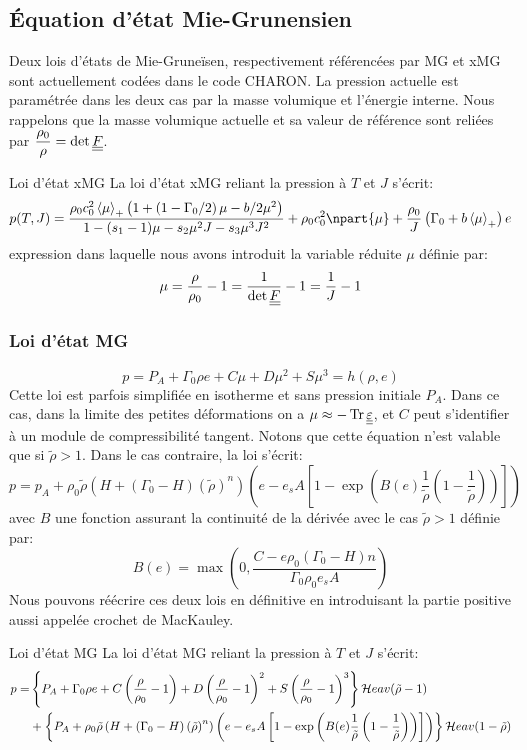 \documentclass[10pt]{book}
\begin{document}
\subsection{Équation d'état Mie-Grunensien}
Deux lois d'états de Mie-Gruneïsen, respectivement référencées par \og
MG \fg{} et \og xMG \fg{} sont actuellement codées dans le code CHARON. La pression actuelle est paramétrée dans les deux cas par la masse volumique et l'énergie interne. Nous rappelons que la masse volumique actuelle et sa valeur de référence sont reliées par $\dfrac{\rho_{0}}{\rho}=\det\underline{\underline{F}}$.
\begin{Propo}{Loi d'état xMG} La loi d'état xMG reliant la pression à $T$ et $J$ s'écrit:
$$p(T,J)=\dfrac{\rho_{0}c_{0}^{2}\ppart{\mu}\left(1+\left(1-\Gamma_{0}/2\right)\mu-b/2\mu^{2}\right)}{1-(s_{1}-1)\mu-s_{2}\mu^{2}J-s_{3}\mu^{3}J^{2}}+\rho_{0}c_{0}^{2}\npart{\mu}+\dfrac{\rho_{0}}{J}\left(\Gamma_{0}+b\ppart{\mu}\right)e$$
expression dans laquelle nous avons introduit la variable réduite $\mu$ définie par:
$$\mu=\dfrac{\rho}{\rho_{0}}-1=\dfrac{1}{\det\underline{\underline{F}}}-1=\dfrac{1}{J}-1$$
\end{Propo}
\subsubsection{Loi d'état MG}
\begin{equation}
p=P_{A}+\Gamma_{0}\rho e+C\mu+D\mu^{2}+S\mu^{3}=h(\rho,e)
\label{eq:PMG}
\end{equation}
Cette loi est parfois simplifiée en isotherme et sans pression initiale $P_{A}$. Dans ce cas, dans la limite des petites déformations on a $\mu \approx -\tr\DefoHPP$, et $C$ peut s'identifier à un module de compressibilité tangent.
Notons que cette équation n'est valable que si $\tilde{\rho}>1$. Dans le cas contraire, la loi s'écrit:
$$p=p_{A}+\rho_{0}\tilde{\rho}\left(H+(\Gamma_{0}-H)\left(\tilde{\rho}\right)^{n}\right)\left(e-e_{s}A\left[1-\exp\left(B(e)\frac{1}{\tilde{\rho}}\left(1-\frac{1}{\tilde{\rho}}\right)\right)\right]\right)$$
avec $B$ une fonction assurant la continuité de la dérivée avec le cas $\tilde{\rho}>1$ définie par:
$$B(e)=\max\left(0,\dfrac{C-e\rho_{0}(\Gamma_{0}-H)n}{\Gamma_{0}\rho_{0}e_{s}A}\right)$$
Nous pouvons réécrire ces deux lois en définitive en introduisant la partie positive aussi appelée crochet de MacKauley.
\begin{Propo}{Loi d'état MG} La loi d'état MG reliant la pression à $T$ et $J$ s'écrit:
$$\begin{aligned}
p =& \left\{P_{A}+\Gamma_{0}\rho e+C\left(\dfrac{\rho}{\rho_{0}}-1\right)+D\left(\dfrac{\rho}{\rho_{0}}-1\right)^{2}+S\left(\dfrac{\rho}{\rho_{0}}-1\right)^{3}\right\}\mathcal{H}eav(\tilde{\rho}-1)\\
&+\left\{P_{A}+\rho_{0}\tilde{\rho}\left(H+(\Gamma_{0}-H)\left(\tilde{\rho}\right)^{n}\right)\left(e-e_{s}A\left[1-\exp\left(B(e)\frac{1}{\tilde{\rho}}\left(1-\frac{1}{\tilde{\rho}}\right)\right)\right]\right)\right\}\mathcal{H}eav(1-\tilde{\rho})
\end{aligned}$$
\end{Propo}
\end{document}
